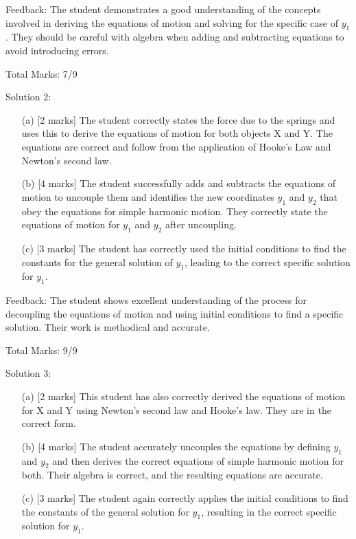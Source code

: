 \documentclass[a4paper,11pt]{article}
\begin{document}
\noindent Feedback: The student demonstrates a good understanding of the concepts involved in deriving the equations of motion and solving for the specific case of \( y_{1} \). They should be careful with algebra when adding and subtracting equations to avoid introducing errors.

\noindent Total Marks: 7/9

\noindent Solution 2:

\begin{itemize}
    \item[(a)] [2 marks] The student correctly states the force due to the springs and uses this to derive the equations of motion for both objects X and Y. The equations are correct and follow from the application of Hooke’s Law and Newton’s second law.
    
    \item[(b)] [4 marks] The student successfully adds and subtracts the equations of motion to uncouple them and identifies the new coordinates \( y_{1} \) and \( y_{2} \) that obey the equations for simple harmonic motion. They correctly state the equations of motion for \( y_{1} \) and \( y_{2} \) after uncoupling.
    
    \item[(c)] [3 marks] The student has correctly used the initial conditions to find the constants for the general solution of \( y_{1} \), leading to the correct specific solution for \( y_{1} \). 
\end{itemize}

\noindent Feedback: The student shows excellent understanding of the process for decoupling the equations of motion and using initial conditions to find a specific solution. Their work is methodical and accurate.

\noindent Total Marks: 9/9

\noindent Solution 3:

\begin{itemize}
    \item[(a)] [2 marks] This student has also correctly derived the equations of motion for X and Y using Newton's second law and Hooke’s law. They are in the correct form.
    
    \item[(b)] [4 marks] The student accurately uncouples the equations by defining \( y_{1} \) and \( y_{2} \) and then derives the correct equations of simple harmonic motion for both. Their algebra is correct, and the resulting equations are accurate.
    
    \item[(c)] [3 marks] The student again correctly applies the initial conditions to find the constants of the general solution for \( y_{1} \), resulting in the correct specific solution for \( y_{1} \).
\end{itemize}
\end{document}
